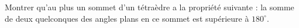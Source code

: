Montrer qu'au plus un sommet d'un tétraèdre a la propriété suivante : la somme de deux quelconques des angles plans en ce sommet est supérieure à $180^\circ$.
